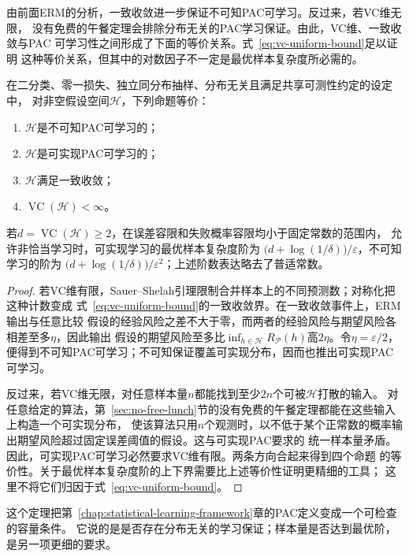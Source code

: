 由前面ERM的分析，一致收敛进一步保证不可知PAC可学习。反过来，若VC维无限，
没有免费的午餐定理会排除分布无关的PAC学习保证。由此，VC维、一致收敛与PAC
可学习性之间形成了下面的等价关系。式~\eqref{eq:vc-uniform-bound}足以证明
这种等价关系，但其中的对数因子不一定是最优样本复杂度所必需的。

\begin{theorem}[二分类学习基本定理]
\label{thm:binary-fundamental-theorem}
在二分类、零一损失、独立同分布抽样、分布无关且满足共享可测性约定的设定中，
对非空假设空间$\mathcal H$，下列命题等价：
\begin{enumerate}
 \item $\mathcal H$是不可知PAC可学习的；
 \item $\mathcal H$是可实现PAC可学习的；
 \item $\mathcal H$满足一致收敛；
 \item $\operatorname{VC}(\mathcal H)<\infty$。
\end{enumerate}
若$d=\operatorname{VC}(\mathcal H)\geq2$，在误差容限和失败概率容限均小于固定常数的范围内，
允许非恰当学习时，可实现学习的最优样本复杂度阶为
$\bigl(d+\log(1/\delta)\bigr)/\varepsilon$，不可知学习的阶为
$\bigl(d+\log(1/\delta)\bigr)/\varepsilon^2$；上述阶数表达略去了普适常数。
\end{theorem}
\begin{proof}
若VC维有限，Sauer--Shelah引理限制合并样本上的不同预测数；对称化把这种计数变成
式~\eqref{eq:vc-uniform-bound}的一致收敛界。在一致收敛事件上，ERM输出与任意比较
假设的经验风险之差不大于零，而两者的经验风险与期望风险各相差至多$\eta$，因此输出
假设的期望风险至多比$\inf_{h\in\mathcal H}R_{\mathcal P}(h)$高$2\eta$。令$\eta=\varepsilon/2$，
便得到不可知PAC可学习；不可知保证覆盖可实现分布，因而也推出可实现PAC可学习。

反过来，若VC维无限，对任意样本量$n$都能找到至少$2n$个可被$\mathcal H$打散的输入。
对任意给定的算法，第~\ref{sec:no-free-lunch}节的没有免费的午餐定理都能在这些输入上构造一个可实现分布，
使该算法只用$n$个观测时，以不低于某个正常数的概率输出期望风险超过固定误差阈值的假设。这与可实现PAC要求的
统一样本量矛盾。因此，可实现PAC可学习必然要求VC维有限。两条方向合起来得到四个命题
的等价性。关于最优样本复杂度阶的上下界需要比上述等价性证明更精细的工具；
这里不将它们归因于式~\eqref{eq:vc-uniform-bound}。
\end{proof}

这个定理把第~\ref{chap:statistical-learning-framework}章的PAC定义变成一个可检查的容量条件。
它说的是是否存在分布无关的学习保证；样本量是否达到最优阶，是另一项更细的要求。

